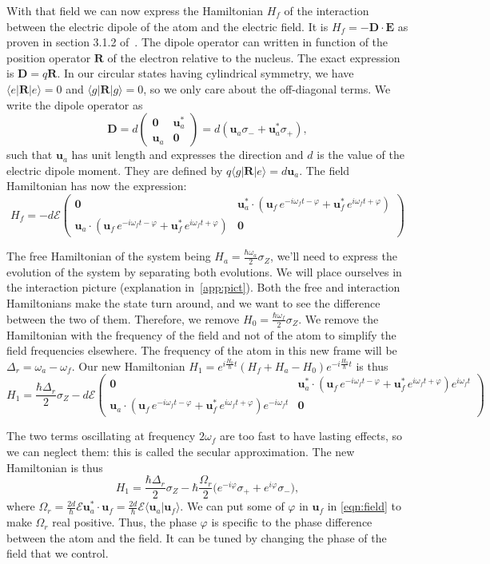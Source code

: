 \documentclass[10pt,a4paper]{report}
\theoremstyle{plain}
\theoremstyle{definition}
\theoremstyle{remark}
\newcommand{\ket}[1]{|#1\rangle}
\newcommand{\bra}[1]{\langle#1|}
\newcommand{\braket}[2]{\langle#1|#2\rangle}
\newcommand{\mat}[1]{\begin{pmatrix}#1\end{pmatrix}}
\newcommand{\bs}{\boldsymbol}
\begin{document}
With that field we can now express the Hamiltonian $H_f$ of the
interaction between the electric dipole of the
atom and the electric field. It is $H_f = - \bs D \cdot \bs E$ as proven in
section 3.1.2 of~\cite{Har06}.
The dipole operator can written in function
of the position operator $\bs R$ of the electron relative to the nucleus.
The exact expression is $\bs D = q \bs R$.
In our circular states having cylindrical symmetry,
we have $\bra e \bs R \ket e = 0$ and $\bra g \bs R \ket g = 0$,
so we only care about the off-diagonal terms. We write the dipole
operator as
\begin{equation}\label{eqn:D}
  \bs D = d\mat{\bs 0&\bs u_a^*\\\bs u_a&\bs 0} = d(\bs u_a \sigma_- + \bs u_a^* \sigma_+),
\end{equation}
such that $\bs u_a$ has unit length and expresses the direction
and $d$ is the value of the electric dipole
moment. They are defined by $ q \bra g \bs R \ket e = d \bs u_a$. The field
Hamiltonian has now the expression:
\[ H_f = -d\mathcal{E} \mat{\bs 0 &
  \bs u_a^* \cdot (\bs u_f\, e^{-i\omega_f t-\varphi} + \bs u_f^*\,
  e^{i\omega_f t + \varphi})\\
\bs u_a \cdot (\bs u_f\, e^{-i\omega_f t-\varphi} + \bs u_f^*\,
  e^{i\omega_f t + \varphi}) & \bs 0
}\]

The free Hamiltonian of the system being $H_a = \frac{\hbar \omega_a}2 \sigma_Z$,
we'll need to express the evolution of the system by separating both evolutions.
We will place ourselves in the interaction picture (explanation
in~\cref{app:pict}). Both the free and interaction Hamiltonians make the state turn
around, and we want to see the difference between the two of them. Therefore, we
remove $H_0 = \frac{\hbar \omega_f}2 \sigma_Z$. We remove the Hamiltonian
with the frequency of the field and not of the atom to simplify the field
frequencies elsewhere. The frequency of the atom in this new frame will be
$\Delta_r = \omega_a - \omega_f$.
Our new Hamiltonian $H_1 = e^{i\frac{H_0}\hbar t}(H_f + H_a - H_0)e^{-i\frac{H_0}\hbar t}$ is thus
\[H_1 = \frac{\hbar \Delta_r}2 \sigma_Z -
  d\mathcal{E} \mat{\bs 0 &
    \bs u_a^* \cdot (\bs u_f\, e^{-i\omega_f t-\varphi} + \bs u_f^*\,
    e^{i\omega_f t + \varphi}) e^{i\omega_f t}\\
    \bs u_a \cdot (\bs u_f\, e^{-i\omega_f t-\varphi} + \bs u_f^*\,
    e^{i\omega_f t + \varphi}) e^{-i\omega_f t} & \bs 0
  }\]

The two terms oscillating at frequency $2\omega_f$ are too fast to have
lasting effects, so we can neglect them: this is called the secular approximation.
The new Hamiltonian is thus
\begin{equation}\label{eqn:RamseyH}
H_1 = \frac{\hbar \Delta_r}2 \sigma_Z -\hbar \frac{\Omega_r}2
  \big(e^{-i\varphi}\sigma_+ + e^{i\varphi}\sigma_-\big),
\end{equation}
where $\Omega_r=\frac{2d}{\hbar}\mathcal{E}\bs u_a^* \cdot \bs u_f = \frac{2d}{\hbar}\mathcal{E}\braket{\bs u_a}{\bs u_f}$. We can put
some of $\varphi$ in $\bs u_f$ in \cref{eqn:field} to make $\Omega_r$ real
positive. Thus, the phase $\varphi$ is specific to the phase difference between the atom
and the field. It can be tuned by changing the phase of the field that we control.
\end{document}
